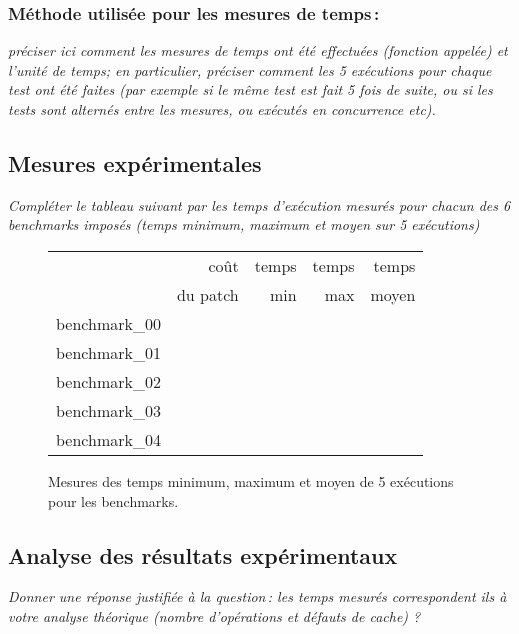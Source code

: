\documentclass[a4paper,10pt,french]{article}
\newcounter{question}%
\begin{document}
    \subsubsection{Méthode utilisée pour les mesures de temps\,: }
      {\em préciser ici  comment les mesures de temps ont été effectuées (fonction appelée) et l'unité de temps; en particulier,
       préciser comment les 5 exécutions pour chaque test ont été faites (par exemple si le même test est fait 5 fois de suite, ou si les tests sont alternés entre
       les mesures, ou exécutés en concurrence etc).
      }

  \subsection{Mesures expérimentales}
    {\em Compléter le tableau suivant par les temps d'exécution mesurés pour chacun des 6 benchmarks imposés
              (temps minimum, maximum et moyen sur 5 exécutions)
    }

    \begin{figure}[h]
      \begin{center}
        \begin{tabular}{|l||r||r|r|r||}
          \hline
          \hline
            & coût         & temps     & temps   & temps \\
            & du patch     & min       & max     & moyen \\
          \hline
          \hline
            benchmark\_00 &      &     &     &     \\
          \hline
            benchmark\_01 &      &     &     &     \\
          \hline
            benchmark\_02 &      &     &     &     \\
          \hline
            benchmark\_03 &      &     &     &     \\
          \hline
            benchmark\_04 &      &     &     &     \\
          \hline
          \hline
        \end{tabular}
        \caption{Mesures des temps minimum, maximum et moyen de 5 exécutions pour les benchmarks.}
        \label{table-temps}
      \end{center}
    \end{figure}

\subsection{Analyse des résultats expérimentaux}
{\em Donner  une réponse justifiée  à la question\,:
              les  temps mesurés correspondent ils  à votre analyse théorique (nombre d’opérations et défauts de cache) ?
}
\end{document}
